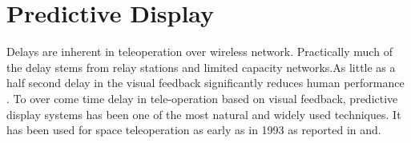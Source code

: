 \section{Predictive Display}
Delays are inherent in teleoperation over wireless network. Practically much of the delay stems from
relay stations and limited capacity networks.As little as a half second delay in the visual feedback significantly reduces human performance \cite{chen2007human}.  To over come time delay in tele-operation based on visual feedback, predictive display systems has been one of the most natural and widely used techniques. It has been used for space teleoperation as early as in 1993 as reported in \cite{sheridan1993space} and\cite{kim1993demonstration}.


